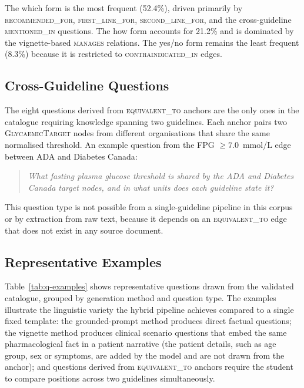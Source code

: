 The which form is the most frequent (52.4\%), driven primarily by \textsc{recommended\_for}, \textsc{first\_line\_for}, \textsc{second\_line\_for}, and the cross-guideline \textsc{mentioned\_in} questions. The how form accounts for 21.2\% and is dominated by the vignette-based \textsc{manages} relations. The yes/no form remains the least frequent (8.3\%) because it is restricted to \textsc{contraindicated\_in} edges.


\subsection{Cross-Guideline Questions}
\label{sec:cross-guideline-q}

The eight questions derived from \textsc{equivalent\_to} anchors are the only
ones in the catalogue requiring knowledge spanning two guidelines. Each anchor
pairs two \textsc{GlycaemicTarget} nodes from different organisations that
share the same normalised threshold. An example question from the
FPG $\geq 7.0$~mmol/L edge between ADA and Diabetes Canada:

\begin{quote}
\textit{What fasting plasma glucose threshold is shared by the ADA and
Diabetes Canada target nodes, and in what units does each guideline state
it?}
\end{quote}

This question type is not possible from a single-guideline pipeline in this corpus or by
extraction from raw text, because it depends on an \textsc{equivalent\_to}
edge that does not exist in any source document.

\subsection{Representative Examples}
\label{sec:q-examples}

Table~\ref{tab:q-examples} shows representative questions drawn from the
validated catalogue, grouped by generation method and question type. The
examples illustrate the linguistic variety the hybrid pipeline achieves
compared to a single fixed template: the grounded-prompt method produces
direct factual questions; the vignette method produces clinical scenario
questions that embed the same pharmacological fact in a patient narrative (the
patient details, such as age group, sex or symptoms, are added by the model
and are not drawn from the anchor);
and questions derived from \textsc{equivalent\_to} anchors require the
student to compare positions across two guidelines simultaneously.

